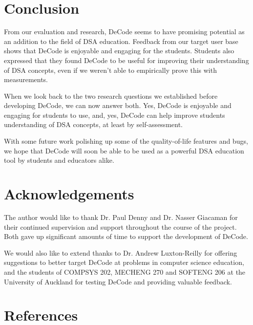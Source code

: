 \documentclass[11pt]{article}
\begin{document}
\section{Conclusion}
From our evaluation and research, DeCode seems to have promising potential as an addition to the field of DSA education. Feedback from our target user base shows that DeCode is enjoyable and engaging for the students. Students also expressed that they found DeCode to be useful for improving their understanding of DSA concepts, even if we weren't able to empirically prove this with measurements.\par
When we look back to the two research questions we established before developing DeCode, we can now answer both. Yes, DeCode is enjoyable and engaging for students to use, and, yes, DeCode can help improve students understanding of DSA concepts, at least by self-assessment.\par
With some future work polishing up some of the quality-of-life features and bugs, we hope that DeCode will soon be able to be used as a powerful DSA education tool by students and educators alike.
\section{Acknowledgements}
The author would like to thank Dr. Paul Denny and Dr. Nasser Giacaman for their continued supervision and support throughout the course of the project. Both gave up significant amounts of time to support the development of DeCode.\par
We would also like to extend thanks to Dr. Andrew Luxton-Reilly for offering suggestions to better target DeCode at problems in computer science education, and the students of COMPSYS 202, MECHENG 270 and SOFTENG 206 at the University of Auckland for testing DeCode and providing valuable feedback.
\begingroup

\section*{References}
  \vspace{2mm}

  \renewcommand{\section}[2]{}

  \begin{spacing}{1.0}

    
    \small
    

  \end{spacing}

\endgroup
\end{document}

